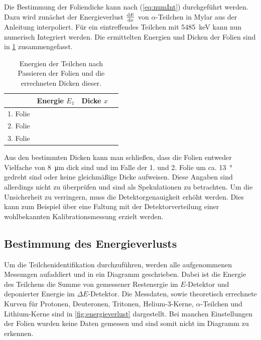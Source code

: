Die Bestimmung der Foliendicke kann nach (\ref{eq:numInt}) durchgeführt werden.
Dazu wird zunächst der Energieverlust $\dv{E}{x}$ von $\alpha$-Teilchen in Mylar aus der Anleitung interpoliert.
Für ein eintreffendes Teilchen mit \SI{5485}{\kilo\electronvolt} kann nun numerisch Integriert werden.
Die ermittelten Energien und Dicken der Folien sind in \cref{tab:dicken} zusammengefasst.

\begin{table}[ht]
	\centering
	\caption{Energien der Teilchen nach Passieren der Folien und die errechneten Dicken dieser.} 
	\label{tab:dicken}
	\begin{tabular}{c|ccc}
		\toprule
		         &          Energie $E_1$          &           Dicke $x$           &  \\ \midrule
		1. Folie &  &  &  \\
		2. Folie &  &  &  \\
		3. Folie &  &  &  \\ \bottomrule
	\end{tabular}
\end{table}

Aus den bestimmten Dicken kann man schließen, dass die Folien entweder Vielfache von \SI{8}{\micro\meter} dick sind und im Falle der 1. und 2. Folie um ca. \SI{13}{\degree} gedreht sind oder keine gleichmäßige Dicke aufweisen.
Diese Angaben sind allerdings nicht zu überprüfen und sind als Spekulationen zu betrachten.
Um die Unsicherheit zu verringern, muss die Detektorgenauigkeit erhöht werden.
Dies kann zum Beispiel über eine Faltung mit der Detektorverteilung einer wohlbekannten Kalibrationsmessung erzielt werden.

\subsection{Bestimmung des Energieverlusts}

Um die Teilchenidentifikation durchzuführen, werden alle aufgenommenen Messungen aufaddiert und in ein Diagramm geschrieben.
Dabei ist die Energie des Teilchens die Summe von gemessener Restenergie im $E$-Detektor und deponierter Energie im $\Delta E$-Detektor.
Die Messdaten, sowie theoretisch errechnete Kurven für Protonen, Deuteronen, Tritonen, Helium-3-Kerne, $\alpha$-Teilchen und Lithium-Kerne sind in \cref{fig:energieverlust} dargestellt.
Bei manchen Einstellungen der Folien wurden keine Daten gemessen und sind somit nicht im Diagramm zu erkennen.

